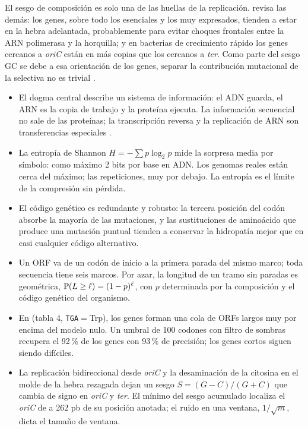 \begin{profundizacion}
El sesgo de composición es solo una de las huellas de la replicación. \textcite{c01-rocha2004} revisa las demás: los genes, sobre todo los esenciales y los muy expresados, tienden a estar en la hebra adelantada, probablemente para evitar choques frontales entre la ARN polimerasa y la horquilla; y en bacterias de crecimiento rápido los genes cercanos a \emph{oriC} están en más copias que los cercanos a \emph{ter}. Como parte del sesgo GC se debe a esa orientación de los genes, separar la contribución mutacional de la selectiva no es trivial \parencite{c01-frank1999}.
\end{profundizacion}

\begin{resumen}
\begin{itemize}
  \item El dogma central describe un sistema de información: el ADN guarda, el ARN es la copia de trabajo y la proteína ejecuta. La información secuencial no sale de las proteínas; la transcripción reversa y la replicación de ARN son transferencias especiales \parencite{c01-crick1970}.
  \item La entropía de Shannon $H=-\sum p\log_2 p$ mide la sorpresa media por símbolo: como máximo 2 bits por base en ADN. Los genomas reales están cerca del máximo; las repeticiones, muy por debajo. La entropía es el límite de la compresión sin pérdida.
  \item El código genético es redundante y robusto: la tercera posición del codón absorbe la mayoría de las mutaciones, y las sustituciones de aminoácido que produce una mutación puntual tienden a conservar la hidropatía mejor que en casi cualquier código alternativo.
  \item Un ORF va de un codón de inicio a la primera parada del mismo marco; toda secuencia tiene seis marcos. Por azar, la longitud de un tramo sin paradas es geométrica, $\mathbb{P}(L\ge\ell)=(1-p)^\ell$, con $p$ determinada por la composición y el código genético del organismo.
  \item En  (tabla 4, \texttt{TGA}$=$Trp), los genes forman una cola de ORFs largos muy por encima del modelo nulo. Un umbral de 100 codones con filtro de sombras recupera el 92\,\% de los genes con 93\,\% de precisión; los genes cortos siguen siendo difíciles.
  \item La replicación bidireccional desde \emph{oriC} y la desaminación de la citosina en el molde de la hebra rezagada dejan un sesgo $S=(G-C)/(G+C)$ que cambia de signo en \emph{oriC} y \emph{ter}. El mínimo del sesgo acumulado localiza el \emph{oriC} de  a 262 pb de su posición anotada; el ruido en una ventana, $1/\sqrt{m}$, dicta el tamaño de ventana.
\end{itemize}
\end{resumen}

